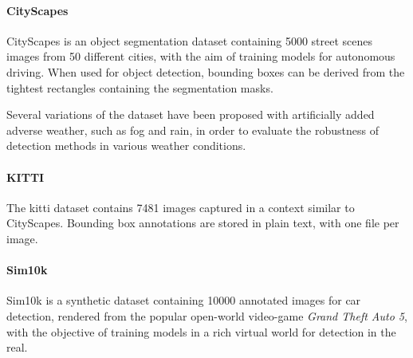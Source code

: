 \documentclass[%
    corpo=12pt,
    twoside,
    stile=classica,   
    tipotesi=magistrale,
    evenboxes,
    english,
	numerazioneromana,
]{toptesi}
\begin{document}
\paragraph{CityScapes}
CityScapes is an object segmentation dataset containing 5000 street scenes images from 50 different cities, with the aim of training models for autonomous driving\cite{cordts2016cityscapes}. When used for object detection, bounding boxes can be derived from the tightest rectangles containing the segmentation masks.

Several variations of the dataset have been proposed with artificially added adverse weather, such as fog\cite{sakaridis2018semantic} and rain\cite{halder2019physicsbased}, in order to evaluate the robustness of detection methods in various weather conditions.

\paragraph{KITTI}
The \gls{kitti} dataset\cite{Geiger2013IJRR} contains 7481 images captured in a context similar to CityScapes. Bounding box annotations are stored in plain text, with one file per image.

\paragraph{Sim10k}
Sim10k is a synthetic dataset containing 10000 annotated images for car detection, rendered from the popular open-world video-game \textit{Grand Theft Auto 5}, with the objective of training models in a rich virtual world for detection in the real\cite{johnsonroberson2017driving}.
\end{document}
